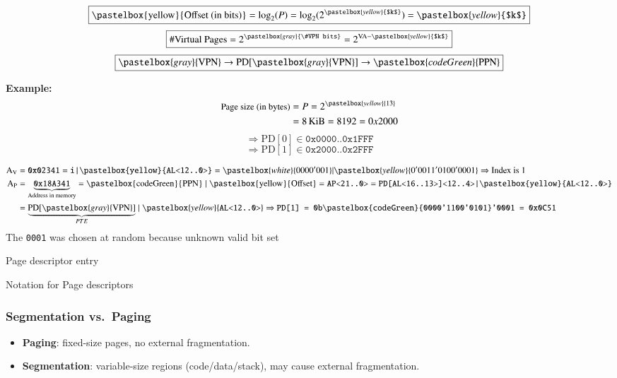 \begin{minipage}{0.48\linewidth}
\begin{center}
\[\boxed{\text{\pastelbox{yellow}{Offset (in bits)}} = \log_2(P) = \log_2(2^{\pastelbox{yellow}{$k$}}) = \pastelbox{yellow}{$k$}}\]
\[\boxed{\#\text{Virtual Pages} = 2^{\pastelbox{gray}{\#VPN bits}} = 2^{\text{VA}-\pastelbox{yellow}{$k$}}}\]
\[\boxed{\pastelbox{gray}{\text{VPN}} \rightarrow \text{PD}[\pastelbox{gray}{\text{VPN}}] \rightarrow \pastelbox{codeGreen}{\text{PPN}}}\]
\end{center}
\end{minipage}\hfill
\begin{minipage}{0.48\linewidth}
  \vspace{0.2cm}
  \textbf{Example:}
\vspace{-0.2cm}
\[\begin{aligned}\text{\small Page size (in bytes)} &= P = 2^{\pastelbox{yellow}{13}}\\
  &= \qty{8}{KiB} = 8192 = 0x2000 \end{aligned}\]
\[\Rightarrow \text{PD}[0] \in \texttt{0x0000..0x1FFF}\]
\[\Rightarrow \text{PD}[1] \in \texttt{0x2000..0x2FFF}\]
\vspace{-0.2cm}
\end{minipage}

\[\begin{aligned}
  \text{A}_\text{V} &= \text{\texttt{0x02341}} = \texttt{i|\pastelbox{yellow}{AL<12..0>}} = \pastelbox{white}{0000'001}|\pastelbox{yellow}{0'0011'0100'0001}\Rightarrow \text{Index is 1}\\
  \text{A}_\text{P} &= \underbrace{\texttt{0x18A341}}_{\text{Address in memory}} = \text{\pastelbox{codeGreen}{PPN}} \mid \text{\pastelbox{yellow}{Offset}} = \text{\texttt{AP<21..0>}} 
              = \text{\texttt{PD[AL<16..13>]<12..4>|\pastelbox{yellow}{AL<12..0>}}}\\
            &= \underbrace{\text{PD}[\pastelbox{gray}{\text{VPN}}]}_{PTE} \mid \pastelbox{yellow}{\texttt{AL<12..0>}} \Rightarrow \texttt{PD[1] = 0\text{b}\pastelbox{codeGreen}{0000'1100'0101}'0001 = 0x0C51}
\end{aligned}\]
The \texttt{0001} was chosen at random because unknown \textrightarrow valid bit set

\begin{minipage}[t]{0.5\columnwidth}
  \vspace*{0cm}
  Page descriptor entry

  
\end{minipage}
\begin{minipage}[t]{0.5\columnwidth}
  \vspace*{0cm}
Notation for Page descriptors

  
\end{minipage}
  \subsubsection{Segmentation vs.\ Paging}
    \begin{itemize}
        \item \textbf{Paging}: fixed-size pages, no external fragmentation.
        \item \textbf{Segmentation}: variable-size regions (code/data/stack), may cause external fragmentation.
    \end{itemize}


